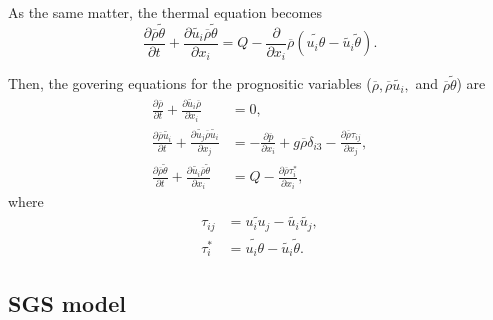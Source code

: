 As the same matter, the thermal equation becomes
\begin{equation}
  \frac{\partial \overline{\rho}\widetilde{\theta}}{\partial t}
  + \frac{\partial \widetilde{u_i}\overline{\rho}\widetilde{\theta}}{\partial x_i}
  = Q -\frac{\partial}{\partial x_i}\overline{\rho}\left(\widetilde{u_i\theta}-\widetilde{u_i}\widetilde{\theta}\right).
\end{equation}

Then, the govering equations for the prognositic variables
($\overline{\rho}, \overline{\rho}\widetilde{u_i}, $ and $\overline{\rho}\widetilde{\theta}$) are
\begin{align}
  \frac{\partial \overline{\rho}}{\partial t}
  + \frac{\partial \widetilde{u_i}\overline{\rho}}{\partial x_i} &= 0, \\
  \frac{\partial \overline{\rho}\widetilde{u_i}}{\partial t}
  + \frac{\partial \widetilde{u_j}\overline{\rho}\widetilde{u_i}}{\partial x_j}
  &= -\frac{\partial \overline{p}}{\partial x_i} + g\overline{\rho}\delta_{i3}
  -\frac{\partial \overline{\rho}\tau_{ij}}{\partial x_j}, \\
  \frac{\partial \overline{\rho}\widetilde{\theta}}{\partial t}
  + \frac{\partial \widetilde{u_i}\overline{\rho}\widetilde{\theta}}{\partial x_i}
  &= Q -\frac{\partial \overline{\rho}\tau^*_{i}}{\partial x_i},
\end{align}
where
\begin{align}
  \tau_{ij} &= \widetilde{u_iu_j}-\widetilde{u_i}\widetilde{u_j}, \\
  \tau^*_{i} &= \widetilde{u_i\theta}-\widetilde{u_i}\widetilde{\theta}.
\end{align}

\subsection{SGS model}
